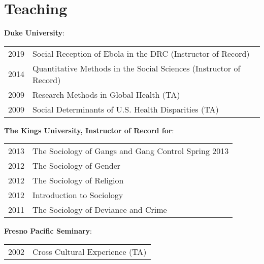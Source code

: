 \section*{Teaching}
\textbf{Duke University}:\\
\begin{tabular}{p{} p{}}
2019 & Social Reception of Ebola in the DRC (Instructor of Record) \\
2014 & Quantitative Methods in the Social Sciences (Instructor of Record)\\
2009 & Research Methods in Global Health (TA) \\
2009 & Social Determinants of U.S. Health Disparities (TA)\\
\end{tabular}
\vspace{.8em}

\textbf{The Kings University, Instructor of Record for}:\\
\begin{tabular}{p{} p{}}
2013 & The Sociology of Gangs and Gang Control \hfill Spring 2013\\
2012 & The Sociology of Gender\\
2012 & The Sociology of Religion \\
2012 & Introduction to Sociology \\
2011 & The Sociology of Deviance and Crime \\
\end{tabular}
\vspace{.8em}

\textbf{Fresno Pacific Seminary}: \\
\begin{tabular}{p{} p{}}
2002 & Cross Cultural Experience (TA) \\
\end{tabular}
 \nopagebreak
